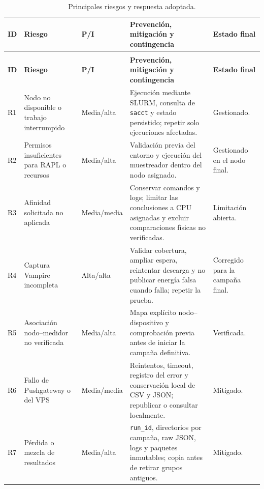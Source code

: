 \begingroup
\small
\setlength{\tabcolsep}{4pt}
\renewcommand{\arraystretch}{1.16}
\begin{longtable}{|
    >{\raggedright\arraybackslash}p{}|
    >{\raggedright\arraybackslash}p{}|
    >{\raggedright\arraybackslash}p{}|
    >{\raggedright\arraybackslash}p{}|
    >{\raggedright\arraybackslash}p{}|}
    \caption{Principales riesgos y respuesta adoptada.}
    \label{tab:riesgos-proyecto} \\
    \hline
    \rowcolor[gray]{0.90}
    \textbf{ID} & \textbf{Riesgo} & \textbf{P/I} & \textbf{Prevención, mitigación y contingencia} & \textbf{Estado final} \\
    \hline
    \endfirsthead
    \multicolumn{5}{c}{\tablename\ \thetable\ (continuación)} \\
    \hline
    \rowcolor[gray]{0.90}
    \textbf{ID} & \textbf{Riesgo} & \textbf{P/I} & \textbf{Prevención, mitigación y contingencia} & \textbf{Estado final} \\
    \hline
    \endhead
    R1 & Nodo no disponible o trabajo interrumpido & Media/alta & Ejecución mediante SLURM, consulta de \texttt{sacct} y estado persistido; repetir solo ejecuciones afectadas. & Gestionado. \\
    \hline
    R2 & Permisos insuficientes para RAPL o recursos & Media/alta & Validación previa del entorno y ejecución del muestreador dentro del nodo asignado. & Gestionado en el nodo final. \\
    \hline
    R3 & Afinidad solicitada no aplicada & Media/media & Conservar comandos y logs; limitar las conclusiones a CPU asignadas y excluir comparaciones físicas no verificadas. & Limitación abierta. \\
    \hline
    R4 & Captura Vampire incompleta & Alta/alta & Validar cobertura, ampliar espera, reintentar descarga y no publicar energía falsa cuando falla; repetir la prueba. & Corregido para la campaña final. \\
    \hline
    R5 & Asociación nodo--medidor no verificada & Media/alta & Mapa explícito nodo--dispositivo y comprobación previa antes de iniciar la campaña definitiva. & Verificada. \\
    \hline
    R6 & Fallo de Pushgateway o del VPS & Media/media & Reintentos, timeout, registro del error y conservación local de CSV y JSON; republicar o consultar localmente. & Mitigado. \\
    \hline
    R7 & Pérdida o mezcla de resultados & Media/alta & \texttt{run\_id}, directorios por campaña, raw JSON, logs y paquetes inmutables; copia antes de retirar grupos antiguos. & Mitigado. \\

\end{longtable}

